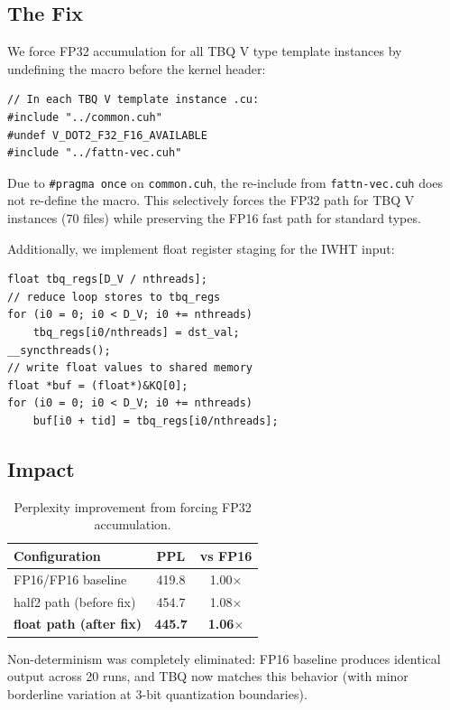 \documentclass[10pt,twocolumn]{article}
\begin{document}
\subsection{The Fix}

We force FP32 accumulation for all TBQ V type template instances by undefining the macro before the kernel header:
\begin{verbatim}
// In each TBQ V template instance .cu:
#include "../common.cuh"
#undef V_DOT2_F32_F16_AVAILABLE
#include "../fattn-vec.cuh"
\end{verbatim}

Due to \texttt{\#pragma once} on \texttt{common.cuh}, the re-include from \texttt{fattn-vec.cuh} does not re-define the macro. This selectively forces the FP32 path for TBQ V instances (70 files) while preserving the FP16 fast path for standard types.

Additionally, we implement float register staging for the IWHT input:
\begin{verbatim}
float tbq_regs[D_V / nthreads];
// reduce loop stores to tbq_regs
for (i0 = 0; i0 < D_V; i0 += nthreads)
    tbq_regs[i0/nthreads] = dst_val;
__syncthreads();
// write float values to shared memory
float *buf = (float*)&KQ[0];
for (i0 = 0; i0 < D_V; i0 += nthreads)
    buf[i0 + tid] = tbq_regs[i0/nthreads];
\end{verbatim}

\subsection{Impact}

\begin{table}[h]
\centering
\small
\begin{tabular}{@{}lcc@{}}
\toprule
Configuration & PPL & vs FP16 \\
\midrule
FP16/FP16 baseline & 419.8 & 1.00$\times$ \\
half2 path (before fix) & 454.7 & 1.08$\times$ \\
\textbf{float path (after fix)} & \textbf{445.7} & \textbf{1.06$\times$} \\
\bottomrule
\end{tabular}
\caption{Perplexity improvement from forcing FP32 accumulation.}
\label{tab:precision}
\end{table}

Non-determinism was completely eliminated: FP16 baseline produces identical output across 20 runs, and TBQ now matches this behavior (with minor borderline variation at 3-bit quantization boundaries).
\end{document}
